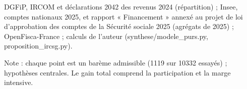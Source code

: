 DGFiP, IRCOM et déclarations 2042 des revenus 2024 (répartition) ; Insee, comptes nationaux 2025, et rapport « Financement » annexé au projet de loi d'approbation des comptes de la Sécurité sociale 2025 (agrégats de 2025) ; OpenFisca-France ; calculs de l'auteur (synthese/modele\_purs.py, proposition\_ircsg.py).\par Note : chaque point est un barème admissible (1119 sur 10332 essayés) ; hypothèses centrales. Le gain total comprend la participation et la marge intensive.
